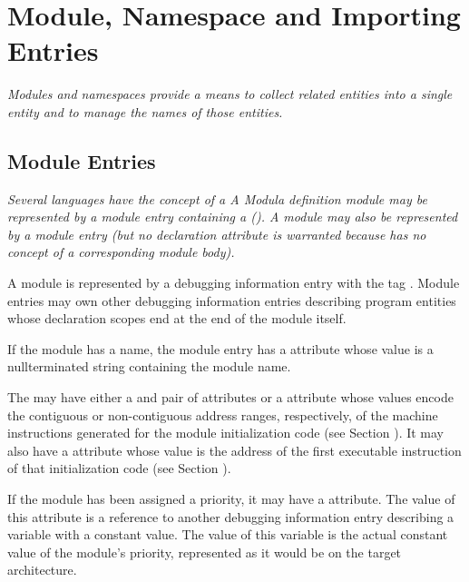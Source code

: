 \section{Module, Namespace and Importing Entries}
\textit{Modules and namespaces provide a means to collect related
entities into a single entity and to manage the names of
those entities.}

\subsection{Module Entries}
\label{chap:moduleentries}
\textit{Several languages have the concept of a 
A Modula definition module
may be represented by a module
entry containing a
(\DWATdeclaration). A
 module
may also be represented by a module entry
(but no declaration attribute is warranted because 
has no concept of a corresponding module body).}

A module is represented by a debugging information entry
with the
tag \DWTAGmoduleTARG.
Module entries may own other
debugging information entries describing program entities
whose declaration scopes end at the end of the module itself.

If the module has a name, the module entry has a
\DWATname{} attribute
whose value is a null\dash terminated string containing
the module name.

The  may have either a
\DWATlowpc{} and
\DWAThighpc{}
pair
of
attributes or a
\DWATranges{} attribute
whose values encode the contiguous or non-contiguous address
ranges, respectively, of the machine instructions generated for
the module initialization
code\hypertarget{chap:DWATentrypcentryaddressofmoduleinitialization}{}
(see Section ).
It may also have a
\DWATentrypc{} attribute whose value is the address of
the first executable instruction of that initialization code
(see Section ).

If\hypertarget{chap:DWATprioritymodulepriority}{}
the module has been assigned a priority, it may have a
\DWATpriorityDEFN{} attribute.
The value of this attribute is a
reference to another debugging information entry describing
a variable with a constant value. The value of this variable
is the actual constant value of the module\textquoteright{s} priority,
represented as it would be on the target architecture.


